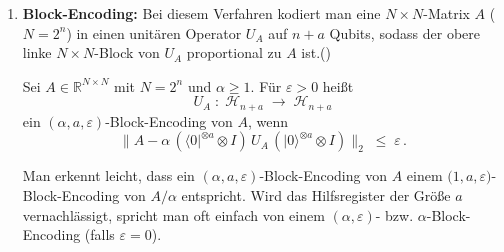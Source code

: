 {\begin{enumerate}
Man spricht auch von \textit{Quantum Sampling Access}, weil das Messen dieses Zustands genau dem Zufallsziehen eines Index $i$ mit Wahrscheinlichkeit $\lvert x_i/\|x\|\rvert^2$ entspricht. Beachte, dass dabei nur die Richtung von $x$ (seine $\ell_2$-Normierung) gespeichert wird und die ursprüngliche Länge $\|x\|$ verloren geht. In vielen Anwendungen stört das jedoch nicht, wenn man vergleichbare Vektoren parallel behandelt.

Diese Idee lässt sich auf Matrizen erweitern. Sei $X\in\mathbb{R}^{n\times d}$ mit Zeilen\\$x^{(1)},\dots,x^{(n)}$, wobei $n$ und $d$ wieder Zweierpotenzen sind. Dann kodieren wir $X$ auf $\lceil\log_2 n\rceil + \lceil\log_2 d\rceil$ Qubits zu

$$
\lvert X\rangle
=\frac{1}{\sqrt{\sum_{i=1}^n\|x^{(i)}\|^2}}
\sum_{i=1}^n\|x^{(i)}\|\;\lvert i\rangle\;\lvert x^{(i)}\rangle,
$$

wobei jeder Index $i$ in den ersten Qubits und die normierte Zeile $x^{(i)}$ in den nächsten Qubits gespeichert wird.\\

  \item \textbf{Block-Encoding:}  
    Bei diesem Verfahren kodiert man eine \(N\times N\)-Matrix \(A\) (\(N=2^n\)) in einen unitären Operator \(U_A\) auf \(n+a\) Qubits,  
    sodass der obere linke \(N\times N\)-Block von \(U_A\) proportional zu \(A\) ist.(\cite{alessandro_luongo_quantum_2024})

    \begin{definition}\label{def:block-encoding}  
    Sei \(A\in\mathbb{R}^{N\times N}\) mit \(N=2^n\) und \(\alpha\ge1\). Für \(\varepsilon>0\) heißt  
    \[
      U_A\;:\;\mathcal{H}_{n+a}\;\to\;\mathcal{H}_{n+a}
    \]  
    ein \((\alpha,a,\varepsilon)\)\nobreakdash-Block-Encoding von \(A\), wenn  
    \[
      \bigl\|A - \alpha\,(\langle0|^{\otimes a}\otimes I)\,U_A\,(|0\rangle^{\otimes a}\otimes I)\bigr\|_2 \;\le\;\varepsilon\,.  
    \]
    \end{definition}  

    Man erkennt leicht, dass ein \((\alpha,a,\varepsilon)\)-Block-Encoding von \(A\) einem  
    \(\bigl(1,a,\varepsilon\bigr)\)-Block-Encoding von \(A/\alpha\) entspricht. Wird das Hilfsregister der Größe \(a\) vernachlässigt, spricht man oft einfach von einem \((\alpha,\varepsilon)\)- bzw. \(\alpha\)-Block-Encoding (falls \(\varepsilon=0\)).  
\end{enumerate}  

}
